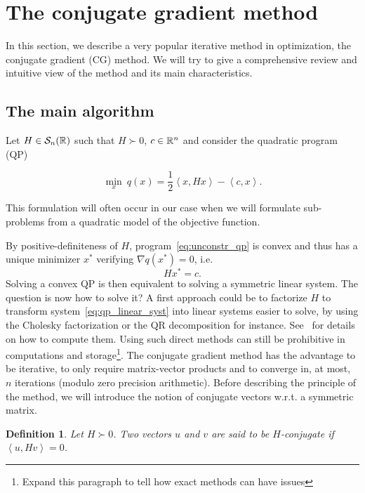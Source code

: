 \documentclass[10pt]{article}
\newtheorem{definition}[theorem]{Definition}
\numberwithin{equation}{section}
\newcommand{\scal}[2]{\left\langle {#1} , {#2} \right\rangle} %
\begin{document}
	\section{The conjugate gradient method}
	
	In this section, we describe a very popular iterative method in optimization, the conjugate gradient (CG) method. We will try to give a comprehensive review and intuitive view of the method and its main characteristics. 
	
	\subsection{The main algorithm}
	
	Let $H \in {\mathcal{S}}_n({\mathbb{R}})$ such that $H \succ 0$, $c \in {\mathbb{R}}^n$ and consider the quadratic program (QP)
	
	\begin{equation}\label{eq:unconstr_qp}
		\min_x \ q(x) = \dfrac{1}{2} \scal{x}{Hx} - \scal{c}{x}.
	\end{equation}
	
	This formulation will often occur in our case when we will formulate sub-problems from a quadratic model of the objective function.
	
	
	By positive-definiteness of $H$, program~\eqref{eq:unconstr_qp} is convex and thus has a unique minimizer $x^*$ verifying $\nabla q(x^*)=0$, i.e.
	\begin{equation}\label{eq:qp_linear_syst}
		Hx^* = c.
	\end{equation}
	Solving a convex QP is then equivalent to solving a symmetric linear system. The question is now how to solve it? A first approach could be to factorize $H$ to transform system~\eqref{eq:qp_linear_syst} into linear systems easier to solve, by using the Cholesky factorization or the QR decomposition for instance. See~\cite{golubvanloan:2013} for details on how to compute them. Using such direct methods can  still be prohibitive in computations and storage\footnote{Expand this paragraph to tell how exact methods can have issues}. The conjugate gradient method has the advantage to be iterative, to only require matrix-vector products and to converge in, at most, $n$ iterations (modulo zero precision arithmetic). Before describing the principle of the method, we will introduce the notion of conjugate vectors w.r.t. a symmetric matrix.
	
	\begin{definition}\label{def:conjugate_vectors}
		Let $H \succ 0$. Two vectors $u$ and $v$ are said to be $H$-conjugate if $\scal{u}{Hv}=0$.
	\end{definition} 
	
\end{document}
